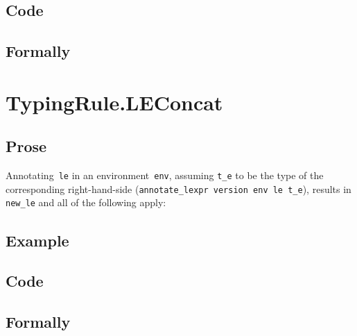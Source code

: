 \documentclass{book}
\begin{document}
  \subsection{Code}

\begin{emptyformal}
    \subsection{Formally}
\end{emptyformal}


\section{TypingRule.LEConcat \label{sec:TypingRule.LEConcat}}

    \subsection{Prose}
   Annotating~\texttt{le} in an environment~\texttt{env}, assuming
\texttt{t\_e} to be the type of the corresponding right-hand-side
(\texttt{annotate\_lexpr version env le t\_e}), results in \texttt{new\_le} and
all of the following apply:
     
  \subsection{Example}

  \subsection{Code}

\begin{emptyformal}
    \subsection{Formally}
\end{emptyformal}

\end{document}

